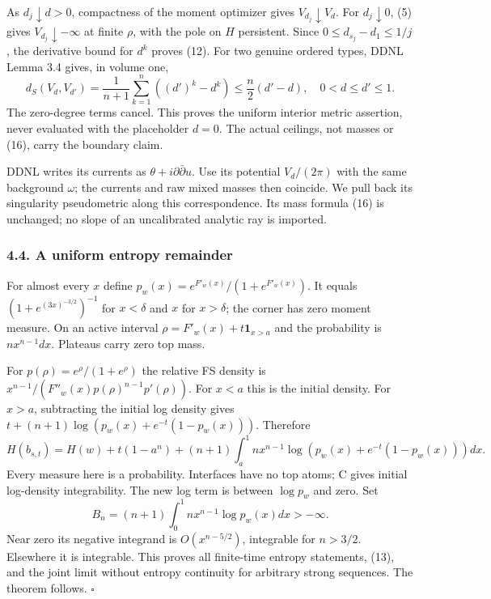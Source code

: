 \documentclass[
  11pt,
]{article}
\begin{document}
As \(d_j\downarrow d>0\), compactness of the moment optimizer gives
\(V_{d_j}\downarrow V_d\). For \(d_j\downarrow0\), (5) gives
\(V_{d_j}\downarrow-\infty\) at finite \(\rho\), with the pole on \(H\)
persistent. Since \(0\le d_{s_j}-d_1\le1/j\), the derivative bound for
\(d^k\) proves (12). For two genuine ordered types, DDNL Lemma 3.4
gives, in volume one, \[
d_S(V_d,V_{d'})=\frac1{n+1}\sum_{k=1}^n((d')^k-d^k)
\le\frac n2(d'-d),\quad 0<d\le d'\le1.
\tag{16}
\] The zero-degree terms cancel. This proves the uniform interior metric
assertion, never evaluated with the placeholder \(d=0\). The actual
ceilings, not masses or (16), carry the boundary claim.

DDNL writes its currents as \(\theta+i\partial\bar\partial u\). Use its
potential \(V_d/(2\pi)\) with the same background \(\omega\); the
currents and raw mixed masses then coincide. We pull back its
singularity pseudometric along this correspondence. Its mass formula
(16) is unchanged; no slope of an uncalibrated analytic ray is imported.

\subsubsection{4.4. A uniform entropy
remainder}\label{a-uniform-entropy-remainder}

For almost every \(x\) define \(p_w(x)=e^{F'_w(x)}/(1+e^{F'_w(x)})\). It
equals \((1+e^{(3x)^{-3/2}})^{-1}\) for \(x<\delta\) and \(x\) for
\(x>\delta\); the corner has zero moment measure. On an active interval
\(\rho=F'_w(x)+t\mathbf1_{x>a}\) and the probability is \(n x^{n-1}dx\).
Plateaus carry zero top mass.

For \(p(\rho)=e^\rho/(1+e^\rho)\) the relative FS density is
\(x^{n-1}/(F''_w(x)p(\rho)^{n-1}p'(\rho))\). For \(x<a\) this is the
initial density. For \(x>a\), subtracting the initial log density gives
\(t+(n+1)\log(p_w(x)+e^{-t}(1-p_w(x)))\). Therefore \[
H(b_{s,t})=H(w)+t(1-a^n)
+(n+1)\int_a^1 n x^{n-1}
\log(p_w(x)+e^{-t}(1-p_w(x)))dx.
\tag{17}
\] Every measure here is a probability. Interfaces have no top atoms; C
gives initial log-density integrability. The new log term is between
\(\log p_w\) and zero. Set \[
B_n=(n+1)\int_0^1 n x^{n-1}\log p_w(x)dx>-\infty.
\tag{18}
\] Near zero its negative integrand is \(O(x^{n-5/2})\), integrable for
\(n>3/2\). Elsewhere it is integrable. This proves all finite-time
entropy statements, (13), and the joint limit without entropy continuity
for arbitrary strong sequences. The theorem follows. \(\square\)
\end{document}
